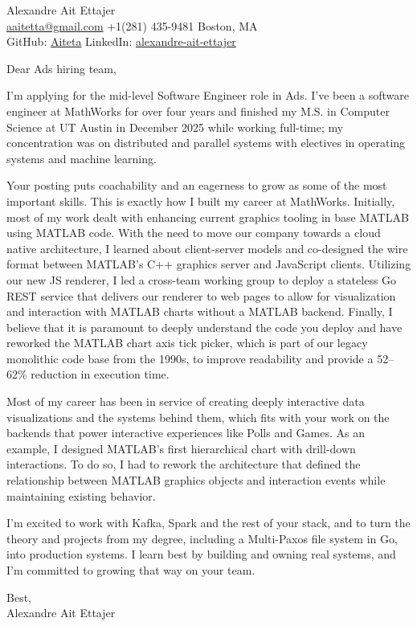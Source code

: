 \documentclass{article}
\begin{document}
\begin{flushleft}
    {\Large Alexandre Ait Ettajer} \\
    \href{mailto:aaitetta@gmail.com}{aaitetta@gmail.com} \quad +1(281) 435-9481 \quad Boston, MA \\
    GitHub: \href{https://github.com/aiteta}{Aiteta} \quad LinkedIn: \href{https://www.linkedin.com/in/alexandre-ait-ettajer-65740b170/}{alexandre-ait-ettajer} \\
\end{flushleft}

\vspace{1em}

Dear Ads hiring team,

I'm applying for the mid-level Software Engineer role in Ads. I've been a software engineer at MathWorks for over four years and finished my M.S. in Computer Science at UT Austin in December 2025 while working full-time; my concentration was on distributed and parallel systems with electives in operating systems and machine learning.

Your posting puts coachability and an eagerness to grow as some of the most important skills. This is exactly how I built my career at MathWorks. Initially, most of my work dealt with enhancing current graphics tooling in base MATLAB using MATLAB code. With the need to move our company towards a cloud native architecture, I learned about client-server models and co-designed the wire format between MATLAB's C++ graphics server and JavaScript clients. Utilizing our new JS renderer, I led a cross-team working group to deploy a stateless Go REST service that delivers our renderer to web pages to allow for visualization and interaction with MATLAB charts without a MATLAB backend. Finally, I believe that it is paramount to deeply understand the code you deploy and have reworked the MATLAB chart axis tick picker, which is part of our legacy monolithic code base from the 1990s, to improve readability and provide a 52--62\% reduction in execution time.

Most of my career has been in service of creating deeply interactive data visualizations and the systems behind them, which fits with your work on the backends that power interactive experiences like Polls and Games. As an example, I designed MATLAB's first hierarchical chart with drill-down interactions. To do so, I had to rework the architecture that defined the relationship between MATLAB graphics objects and interaction events while maintaining existing behavior.

I'm excited to work with Kafka, Spark and the rest of your stack, and to turn the theory and projects from my degree, including a Multi-Paxos file system in Go, into production systems. I learn best by building and owning real systems, and I'm committed to growing that way on your team.

Best, \\
Alexandre Ait Ettajer
\end{document}
